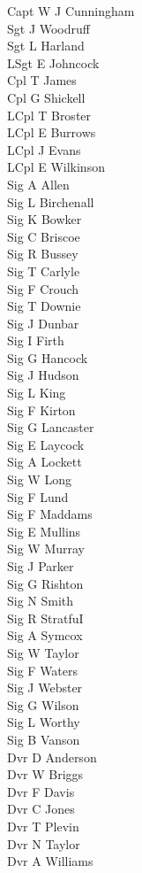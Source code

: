 \begin{multicols}{2}
  \noindent
  Capt W J Cunningham \\
  Sgt J Woodruff \\
  Sgt L Harland \\
  LSgt E Johncock \\
  Cpl T James \\
  Cpl G Shickell \\
  LCpl T Broster \\
  LCpl E Burrows \\
  LCpl J Evans \\
  LCpl E Wilkinson \\
  Sig A Allen \\
  Sig L Birchenall \\
  Sig K Bowker \\
  Sig C Briscoe \\
  Sig R Bussey \\
  Sig T Carlyle \\
  Sig F Crouch \\
  Sig T Downie \\
  Sig J Dunbar \\
  Sig I Firth \\
  Sig G Hancock \\
  Sig J Hudson \\
  Sig L King \\
  Sig F Kirton \\
  Sig G Lancaster \\
  Sig E Laycock \\
  Sig A Lockett \\
  Sig W Long \\
  Sig F Lund \\
  Sig F Maddams \\
  Sig E Mullins \\
  Sig W Murray \\
  Sig J Parker \\
  Sig G Rishton \\
  Sig N Smith \\
  Sig R StratfuI \\
  Sig A Symcox \\
  Sig W Taylor \\
  Sig F Waters \\
  Sig J Webster \\
  Sig G Wilson \\
  Sig L Worthy \\
  Sig B Vanson \\
  Dvr D Anderson \\
  Dvr W Briggs \\
  Dvr F Davis \\
  Dvr C Jones \\
  Dvr T Plevin \\
  Dvr N Taylor \\
  Dvr A Williams \\
\end{multicols}

